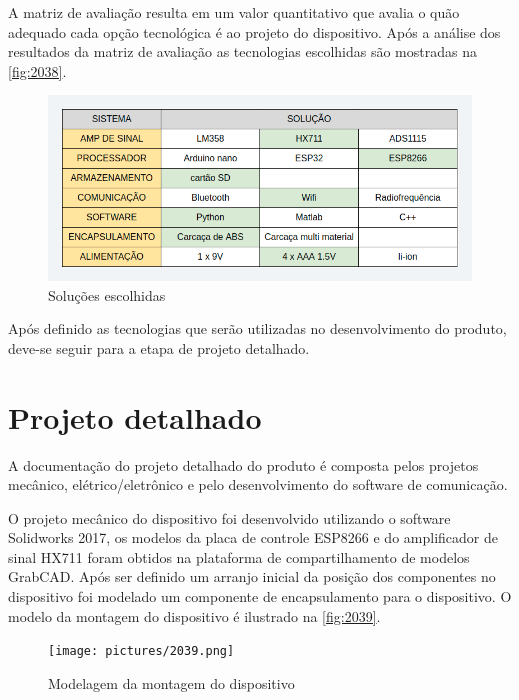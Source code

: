 A matriz de avaliação resulta em um valor quantitativo que avalia o quão adequado cada opção tecnológica é ao projeto do dispositivo.
Após a análise dos resultados da matriz de avaliação as tecnologias escolhidas são mostradas na \autoref{fig:2038}.


\begin{figure}[H]
	\caption{\label{fig:2038} Soluções escolhidas}
	\begin{center}
		\includegraphics[width=\textwidth]{pictures/2038.png}
	\end{center}
\end{figure}

Após definido as tecnologias que serão utilizadas no desenvolvimento do produto, deve-se seguir para a etapa de projeto detalhado.

\section{Projeto detalhado}

A documentação do projeto detalhado do produto é composta pelos projetos mecânico, elétrico/eletrônico e pelo desenvolvimento do software de comunicação.

O projeto mecânico do dispositivo foi desenvolvido utilizando o software Solidworks 2017, os modelos da placa de controle ESP8266 e do amplificador de sinal HX711
foram obtidos na plataforma de compartilhamento de modelos GrabCAD. Após ser definido um arranjo inicial da posição dos componentes no dispositivo foi modelado um
componente de encapsulamento para o dispositivo.
O modelo da montagem do dispositivo é ilustrado na \autoref{fig:2039}.

\begin{figure}[H]
	\caption{\label{fig:2039} Modelagem da montagem do dispositivo}
	\begin{center}
		\texttt{[image: pictures/2039.png]}
	\end{center}
\end{figure}

